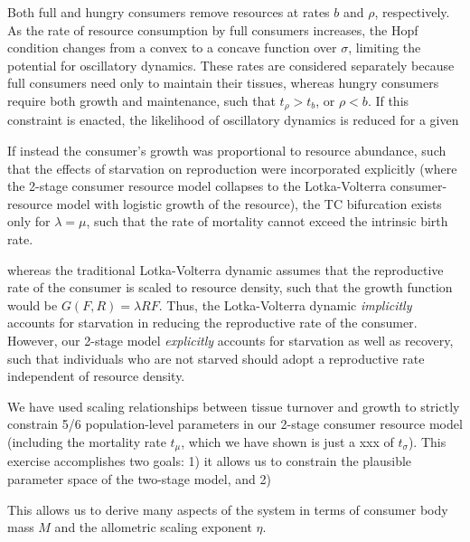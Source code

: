 \documentclass[12pt,english]{article}
\begin{document}
\begin{spacing}{1.9}
Both full and hungry consumers remove resources at rates $b$ and $\rho$, respectively.
As the rate of resource consumption by full consumers increases, the Hopf condition changes from a convex to a concave function over $\sigma$, limiting the potential for oscillatory dynamics.
These rates are considered separately because full consumers need only to maintain their tissues, whereas hungry consumers require both growth and maintenance, such that $t_\rho > t_b$, or $\rho < b$.
If this constraint is enacted, the likelihood of oscillatory dynamics is reduced for a given 



If instead the consumer's growth was proportional to resource abundance, such that the effects of starvation on reproduction were incorporated explicitly (where the 2-stage consumer resource model collapses to the Lotka-Volterra consumer-resource model with logistic growth of the resource), the TC bifurcation exists only for $\lambda = \mu$, such that the rate of mortality cannot exceed the intrinsic birth rate.


 whereas the traditional Lotka-Volterra dynamic assumes that the reproductive rate of the consumer is scaled to resource density, such that the growth function would be $G(F,R) = \lambda R F$.
Thus, the Lotka-Volterra dynamic \emph{implicitly} accounts for starvation in reducing the reproductive rate of the consumer.
However, our 2-stage model \emph{explicitly} accounts for starvation as well as recovery, such that individuals who are not starved should adopt a reproductive rate independent of resource density.



We have used scaling relationships between tissue turnover and growth to strictly constrain 5/6 population-level parameters in our 2-stage consumer resource model (including the mortality rate $t_\mu$, which we have shown is just a xxx of $t_\sigma$).
This exercise accomplishes two goals:
1) it allows us to constrain the plausible parameter space of the two-stage model, and 
2) 

This allows us to derive many aspects of the system in terms of consumer body mass $M$ and the allometric scaling exponent $\eta$.



 \\ \nonumber







\end{spacing}
\end{document}
